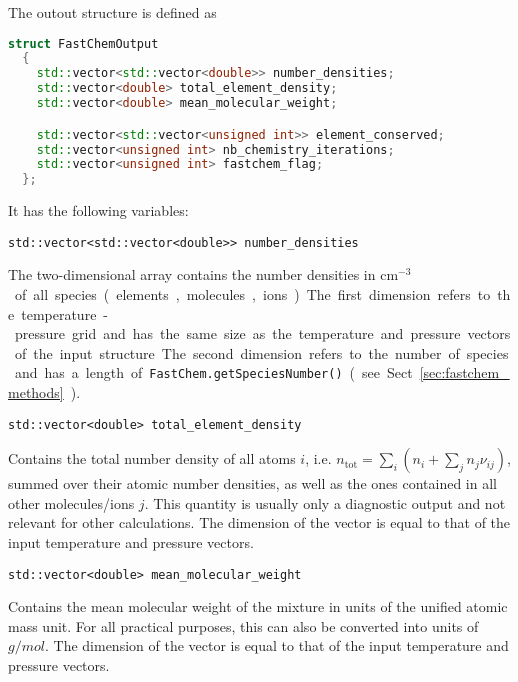 \documentclass[numbers=noenddot]{aux/fcmanual}
\begin{document}
The outout structure is defined as
\begin{lstlisting}[language=C++]
  struct FastChemOutput
  {
    std::vector<std::vector<double>> number_densities;
    std::vector<double> total_element_density;
    std::vector<double> mean_molecular_weight;

    std::vector<std::vector<unsigned int>> element_conserved;
    std::vector<unsigned int> nb_chemistry_iterations;
    std::vector<unsigned int> fastchem_flag;
  };
\end{lstlisting}

It has the following variables:

\lstinline!std::vector<std::vector<double>> number_densities!
  \begin{addmargin}[25pt]{0pt}
    The two-dimensional array contains the number densities in \unit{cm$^{-3}$} of all species (elements, molecules, ions). The first dimension refers to the temperature-pressure grid and has the same size as the temperature and pressure vectors of the input structure. The second dimension refers to the number of species and has a length of \lstinline!FastChem.getSpeciesNumber()! (see Sect. \ref{sec:fastchem_methods}).
  \end{addmargin}
  
\bigbreak

\lstinline!std::vector<double> total_element_density!
\begin{addmargin}[25pt]{0pt}
  Contains the total number density of all atoms $i$, i.e. $n_\mathrm{tot} = \sum_i \left( n_i + \sum_j n_j \nu_{ij} \right)$, summed over their atomic number densities, as well as the ones contained in all other molecules/ions $j$. This quantity is usually only a diagnostic output and not relevant for other calculations. The dimension of the vector is equal to that of the input temperature and pressure vectors.
\end{addmargin}

\bigbreak

\lstinline!std::vector<double> mean_molecular_weight!
\begin{addmargin}[25pt]{0pt}
  Contains the mean molecular weight of the mixture in units of the unified atomic mass unit. For all practical purposes, this can also be converted into units of $\unit{g/mol}$. The dimension of the vector is equal to that of the input temperature and pressure vectors.
\end{addmargin}

\bigbreak
\end{document}
